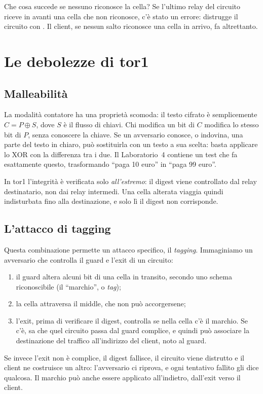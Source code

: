 Che cosa succede se nessuno riconosce la cella? Se l'ultimo relay del circuito riceve in avanti una cella che non riconosce, c'è stato un errore: distrugge il circuito con . Il client, se nessun salto riconosce una cella in arrivo, fa altrettanto.

\section{Le debolezze di tor1}\label{sec:tor1-debolezze}

\subsection{Malleabilità}

La modalità contatore ha una proprietà scomoda: il testo cifrato è semplicemente $C = P \oplus S$, dove $S$ è il flusso di chiavi. Chi modifica un bit di $C$ modifica lo stesso bit di $P$, senza conoscere la chiave. Se un avversario conosce, o indovina, una parte del testo in chiaro, può sostituirla con un testo a sua scelta: basta applicare lo XOR con la differenza tra i due. Il Laboratorio~4 contiene un test che fa esattamente questo, trasformando \enquote{paga 10 euro} in \enquote{paga 99 euro}.

In tor1 l'integrità è verificata solo \emph{all'estremo}: il digest viene controllato dal relay destinatario, non dai relay intermedi. Una cella alterata viaggia quindi indisturbata fino alla destinazione, e solo lì il digest non corrisponde.

\subsection{L'attacco di tagging}

Questa combinazione permette un attacco specifico, il \emph{tagging}. Immaginiamo un avversario che controlla il guard e l'exit di un circuito:
\begin{enumerate}
  \item il guard altera alcuni bit di una cella in transito, secondo uno schema riconoscibile (il \enquote{marchio}, o \emph{tag});
  \item la cella attraversa il middle, che non può accorgersene;
  \item l'exit, prima di verificare il digest, controlla se nella cella c'è il marchio. Se c'è, sa che quel circuito passa dal guard complice, e quindi può associare la destinazione del traffico all'indirizzo del client, noto al guard.
\end{enumerate}
Se invece l'exit non è complice, il digest fallisce, il circuito viene distrutto e il client ne costruisce un altro: l'avversario ci riprova, e ogni tentativo fallito gli dice qualcosa. Il marchio può anche essere applicato all'indietro, dall'exit verso il client.

